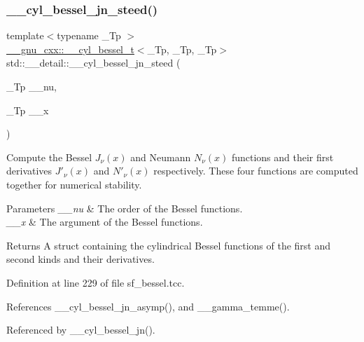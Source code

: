 \subsubsection{\texorpdfstring{\+\_\+\+\_\+cyl\+\_\+bessel\+\_\+jn\+\_\+steed()}{\_\_cyl\_bessel\_jn\_steed()}}
{\footnotesize\ttfamily template$<$typename \+\_\+\+Tp $>$ \\
\hyperlink{struct____gnu__cxx_1_1____cyl__bessel__t}{\+\_\+\+\_\+gnu\+\_\+cxx\+::\+\_\+\+\_\+cyl\+\_\+bessel\+\_\+t}$<$\+\_\+\+Tp, \+\_\+\+Tp, \+\_\+\+Tp$>$ std\+::\+\_\+\+\_\+detail\+::\+\_\+\+\_\+cyl\+\_\+bessel\+\_\+jn\+\_\+steed (\begin{DoxyParamCaption}\item[{\+\_\+\+Tp}]{\+\_\+\+\_\+nu,  }\item[{\+\_\+\+Tp}]{\+\_\+\+\_\+x }\end{DoxyParamCaption})}



Compute the Bessel $ J_\nu(x) $ and Neumann $ N_\nu(x) $ functions and their first derivatives $ J'_\nu(x) $ and $ N'_\nu(x) $ respectively. These four functions are computed together for numerical stability. 


\begin{DoxyParams}{Parameters}
{\em \+\_\+\+\_\+nu} & The order of the Bessel functions. \\
\hline
{\em \+\_\+\+\_\+x} & The argument of the Bessel functions. \\
\hline
\end{DoxyParams}
\begin{DoxyReturn}{Returns}
A struct containing the cylindrical Bessel functions of the first and second kinds and their derivatives. 
\end{DoxyReturn}


Definition at line 229 of file sf\+\_\+bessel.\+tcc.



References \+\_\+\+\_\+cyl\+\_\+bessel\+\_\+jn\+\_\+asymp(), and \+\_\+\+\_\+gamma\+\_\+temme().



Referenced by \+\_\+\+\_\+cyl\+\_\+bessel\+\_\+jn().

\mbox{\label{namespacestd_1_1____detail_ac9152f2369a18aa795fe24ccfa6dcf12}} 
